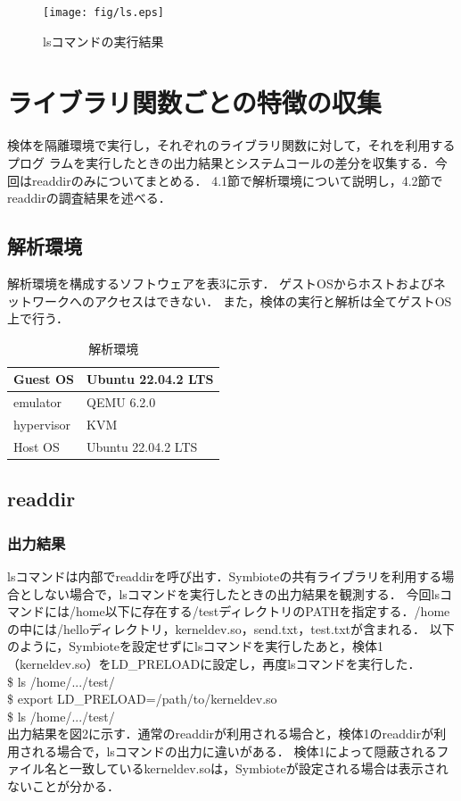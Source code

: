 \documentclass[submit,techreq,noauthor]{eco}	%
\begin{document}
\begin{figure}[t]
	\centering
  \texttt{[image: fig/ls.eps]}
	\caption{lsコマンドの実行結果}
	\label{fig:ls}
\end{figure}

\section{ライブラリ関数ごとの特徴の収集}
検体を隔離環境で実行し，それぞれのライブラリ関数に対して，それを利用するプログ
ラムを実行したときの出力結果とシステムコールの差分を収集する．今回はreaddirのみについてまとめる．
\indent
4.1節で解析環境について説明し，4.2節でreaddirの調査結果を述べる．

\subsection{解析環境}
解析環境を構成するソフトウェアを表3に示す．
ゲストOSからホストおよびネットワークへのアクセスはできない．
また，検体の実行と解析は全てゲストOS上で行う．



\begin{table}[t]
  \caption{解析環境}
  \label{table: 解析環境}
  \centering
  \begin{tabular}{|l|l|}
  \hline
  Guest OS   & Ubuntu 22.04.2 LTS \\ \hline
  emulator   & QEMU 6.2.0         \\ \hline
  hypervisor & KVM                \\ \hline
  Host OS    & Ubuntu 22.04.2 LTS \\ \hline
  \end{tabular}
\end{table}



\subsection{readdir}
\subsubsection{出力結果}
lsコマンドは内部でreaddirを呼び出す．Symbioteの共有ライブラリを利用する場合としない場合で，lsコマンドを実行したときの出力結果を観測する．
今回lsコマンドには/home以下に存在する/testディレクトリのPATHを指定する．/homeの中には/helloディレクトリ，kerneldev.so，send.txt，test.txtが含まれる．
以下のように，Symbioteを設定せずにlsコマンドを実行したあと，検体1（kerneldev.so）をLD\_PRELOADに設定し，再度lsコマンドを実行した．\\
\$ ls /home/.../test/\\
\$ export LD\_PRELOAD=/path/to/kerneldev.so\\
\$ ls /home/.../test/\\
出力結果を図2に示す．通常のreaddirが利用される場合と，検体1のreaddirが利用される場合で，lsコマンドの出力に違いがある．
検体1によって隠蔽されるファイル名と一致しているkerneldev.soは，Symbioteが設定される場合は表示されないことが分かる．\\
\end{document}
